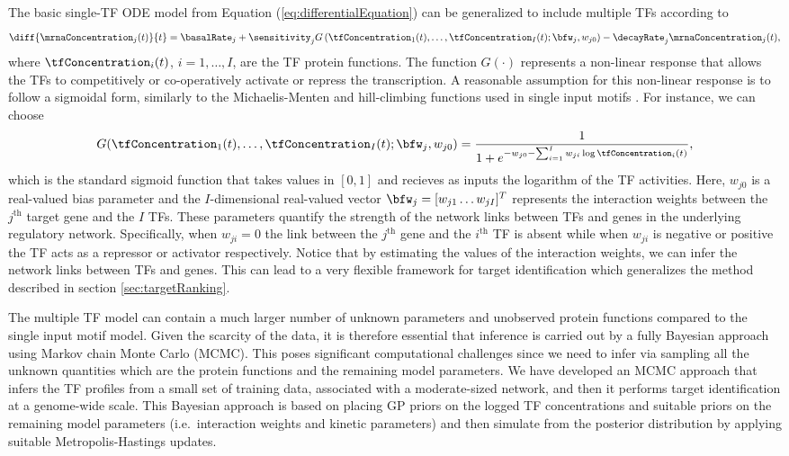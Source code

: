 \documentclass{article}
\begin{document}
The basic single-TF ODE model from Equation 
(\ref{eq:differentialEquation}) can be generalized
to include multiple TFs according to  
\begin{equation}
\diff{\mrnaConcentration_j(t)}{t} = \basalRate_j + 
\sensitivity_j G
\left(\tfConcentration_1(t),\ldots,\tfConcentration_I(t);
  \bfw_j, w_{j0}\right) -\decayRate_j \mrnaConcentration_j(t), \label{eq:multipleTFtranscription}
\end{equation}
where $\tfConcentration_i(t)$, $i=1,\ldots,I$, are the TF protein
functions.  The function $G(\cdot)$ represents a non-linear response
that allows the TFs to competitively or co-operatively activate or
repress the transcription. A reasonable assumption for this non-linear
response is to follow a sigmoidal form, similarly to the
Michaelis-Menten and hill-climbing functions used in single input
motifs \citep{Alon:systems06}. For instance, we can choose
\begin{equation} 
G(\tfConcentration_1(t),\ldots,\tfConcentration_I(t); \bfw_j, w_{j0})
= \frac{1}{1 + e^{-w_{j0}  - \sum_{i=1}^I w_{ji} \log \tfConcentration_i(t)}},
\label{eq:multipleTFhillFun}
\end{equation}
which is the standard sigmoid function that takes values in $[0,1]$
and recieves as inputs the logarithm of the TF activities.  Here,
$w_{j0}$ is a real-valued bias parameter and the $I$-dimensional
real-valued vector $\bfw_j = [w_{j1} \ldots w_{jI}]^T$ represents the
interaction weights between the $j^{\text{th}}$ target gene and the
$I$ TFs. These parameters quantify the strength of the network links
between TFs and genes in the underlying regulatory network.
Specifically, when $w_{ji}=0$ the link between the $j^{\text{th}}$
gene and the $i^{\text{th}}$ TF is absent while when $w_{ji}$ is
negative or positive the TF acts as a repressor or activator
respectively.  Notice that by estimating the values of the interaction
weights, we can infer the network links between TFs and genes. This
can lead to a very flexible framework for target identification which
generalizes the method described in section \ref{sec:targetRanking}.

The multiple TF model can contain a much larger number of unknown
parameters and unobserved protein functions compared to the single
input motif model. Given the scarcity of the data, it is therefore
essential that inference is carried out by a fully Bayesian approach
using Markov chain Monte Carlo (MCMC).  This poses significant
computational challenges since we need to infer via sampling all the
unknown quantities which are the protein functions and the remaining
model parameters.  We have developed an MCMC approach that infers the
TF profiles from a small set of training data, associated with a
moderate-sized network, and then it performs target identification at
a genome-wide scale.
This Bayesian approach is based on placing 
GP priors on the logged TF concentrations and suitable priors on the
remaining model parameters (i.e.\ interaction weights and kinetic parameters) 
and then simulate from the posterior distribution  
by applying suitable Metropolis-Hastings updates.     
\end{document}
